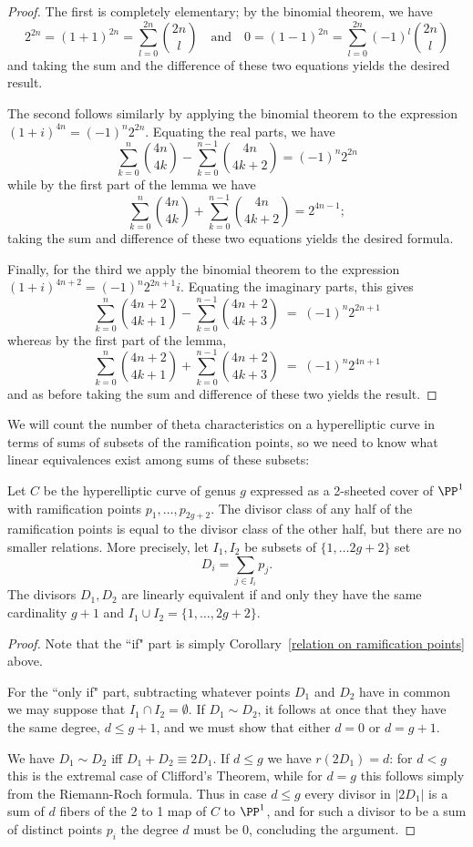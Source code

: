 \begin{proof}
The first is completely elementary; by the binomial theorem, we have
$$
2^{2n} = (1+1)^{2n} = \sum_{l = 0}^{2n} \binom{2n}{l} \quad \text{and} \quad 0 = (1-1)^{2n} = \sum_{l = 0}^{2n} (-1)^l\binom{2n}{l}
$$
and taking the sum and the difference of these two equations yields the desired result.

The second  follows similarly by applying the binomial theorem to the expression $(1 + i)^{4n} = (-1)^n2^{2n}$. Equating the real parts, we have
$$
\sum_{k=0}^n \binom{4n}{4k} - \sum_{k=0}^{n-1} \binom{4n}{4k+2} = (-1)^n2^{2n}
$$
while by the first part of the lemma we have
$$
\sum_{k=0}^n \binom{4n}{4k} + \sum_{k=0}^{n-1} \binom{4n}{4k+2} = 2^{4n-1};
$$
taking the sum and difference of these two equations yields the desired formula.

Finally, for the third we apply the binomial theorem to the expression $(1 + i)^{4n+2} = (-1)^n2^{2n+1}i$. Equating the imaginary parts, this gives
$$
\sum_{k=0}^n \binom{4n+2}{4k+1} - \sum_{k=0}^{n-1} \binom{4n+2}{4k+3} \; = \; (-1)^n2^{2n+1}
$$
whereas by the first part of the lemma,
$$
\sum_{k=0}^n \binom{4n+2}{4k+1} + \sum_{k=0}^{n-1} \binom{4n+2}{4k+3} \; = \; (-1)^n 2^{4n+1}
$$
and as before taking the sum and difference of these two yields the result.
\end{proof}

We will count the number of theta characteristics on a hyperelliptic curve in terms of sums of subsets of the ramification points, so we need to know what linear equivalences exist among sums of these subsets:

\begin{lemma}\label{ramification point relations}
Let $C$ be the hyperelliptic curve of genus $g$ expressed as a 2-sheeted cover of $\PP^1$ with ramification points $p_1,\dots,p_{2g+2}$. The divisor class of
 any half of the ramification points is equal to the divisor class of the other half, but there are no
 smaller relations. More precisely,
 let $I_1,I_2$ be subsets of $\{1,\dots 2g+2\}$
set 
$$
D_i = \sum_{j\in I_i} p_j.
$$
The divisors $D_1,D_2$ are linearly equivalent if and only they
have the same cardinality $g+1$ and $I_1\cup I_2 = \{1,\dots, 2g+2\}$.\end{lemma}

\begin{proof}
Note that the ``if" part is simply Corollary~\ref{relation on ramification points} above.

For the ``only if" part, subtracting whatever points $D_1$ and $D_2$ have in common we may suppose
that $I_1\cap I_2 = \emptyset$. If $D_1\sim D_2$, it follows at once that they have the same degree, $d\leq g+1$, and we must show that either $d=0$ or $d=g+1$.

We have $D_1\sim D_2$ iff $D_1+D_2\equiv 2D_1$. If
$d\leq g$ we have $r(2D_1) = d$: for $d<g$ this is
the extremal case of Clifford's Theorem, while for $d = g$ this follows simply from the 
Riemann-Roch formula. Thus in case $d \leq g$ every divisor in $|2D_1|$ is a sum of $d$ fibers of the 
2 to 1 map of $C$ to $\PP^1$, and for such a divisor to be a sum of distinct points $p_i$
the degree $d$ must be 0, concluding the argument.
\end{proof}


